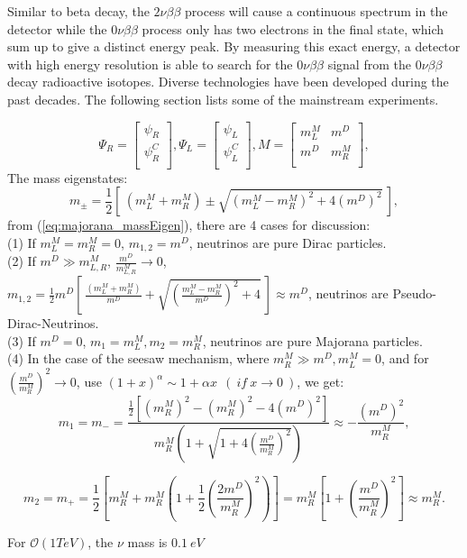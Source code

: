 Similar to beta decay, the $2\nu\beta\beta$ process will cause a continuous spectrum in the detector while the $0\nu\beta\beta$ process only has two electrons in the final state, which sum up to give a distinct energy peak. By measuring this exact energy, a detector with high energy resolution is able to search for the $0\nu\beta\beta$ signal from the $0\nu\beta\beta$ decay radioactive isotopes. Diverse technologies have been developed during the past decades. The following section lists some of the mainstream experiments.

\begin{equation}\label{eq:majoranaField}
\Psi_R=\begin{bmatrix}
\psi_R\\
\psi_R^C\\
\end{bmatrix},
\Psi_L=\begin{bmatrix}
\psi_L\\
\psi_L^C\\
\end{bmatrix},
M=\begin{bmatrix}
m_L^M &  m^D\\
m^D &  m_R^M\\
\end{bmatrix},
\end{equation}
%
The mass eigenstates:
\[
m_{\pm} = \frac{1}{2}[~(m_L^M+m_R^M)\pm\sqrt{(m_L^M-m_R^M)^2+4(m^D)^2}~]\label{eq:majorana_massEigen},
\]
from (\ref{eq:majorana_massEigen}), there are 4 cases for discussion:\\
(1) If $m_L^M=m_R^M=0$, $m_{1,2}=m^D$, neutrinos are pure Dirac particles.\\
(2) If $m^D\gg m^M_{L,R}$, $\frac{m^D}{m_{L,R}^M}\to 0$, $m_{1,2}=\frac{1}{2}m^D[~\frac{(m_L^M+m_R^M)}{m^D}+\sqrt{(\frac{m^M_L-m^M_R}{m^D})^2+4}~]\approx m^D$, neutrinos are Pseudo-Dirac-Neutrinos.
\\
(3) If $m^D=0$, $m_1=m^M_L, m_2=m^M_R$, neutrinos are pure Majorana particles.\\
(4) In the case of the seesaw mechanism, where $m_R^M\gg m^D, m_L^M=0$,
and for $(\frac{m^D}{m_R^M})^2\to 0$, use $(1+x)^\alpha\sim 1+\alpha x ~~(~if~x\to 0~)$, we get:
\[
m_1=m_-=\frac{\frac{1}{2}[(m^M_R)^2-(m^M_R)^2-4(m^D)^2]}{m_R^M(1+\sqrt{1+4(\frac{m^D}{m^M_R})^2})}\approx -\frac{(m^D)^2}{m^M_R},
\]

\[
m_2=m_+=\frac{1}{2}[m^M_R+m^M_R(1+\frac{1}{2}(\frac{2m^D}{m^M_R})^2)]=m^M_R[1+(\frac{m^D}{m^M_R})^2]\approx m^M_R.
\]


For $\mathcal{O}(1TeV)$, the $\nu$ mass is $0.1~eV$




